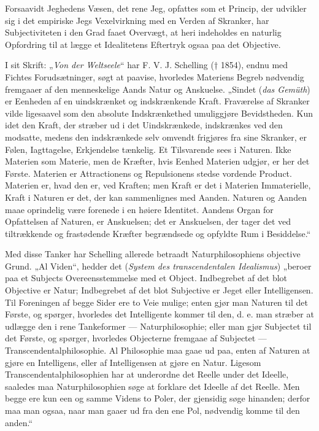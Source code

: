 \documentclass[12pt]{book}
\newcommand{\opage}[1]{\marginnote{\footnotesize\textit{[#1]}}}
\begin{document}
\opage{36} Forsaavidt Jeghedens Væsen, det rene Jeg, opfattes som et Princip, der udvikler sig
i det empiriske Jegs Vexelvirkning med en Verden af Skranker, har Subjectiviteten i
den Grad faaet Overvægt, at heri indeholdes en naturlig Opfordring til at lægge et
Idealitetens Eftertryk ogsaa paa det Objective.

I sit Skrift: „\textit{Von der Weltseele}“ har F. V. J. Schelling († 1854), endnu
med Fichtes Forudsætninger, søgt at paavise, hvorledes Materiens Begreb nødvendig
fremgaaer af den menneskelige Aands Natur og Anskuelse. „Sindet (\textit{das
Gemüth}) er Eenheden af en uindskrænket og indskrænkende Kraft. Fraværelse af
Skranker vilde ligesaavel som den absolute Indskrænkethed umuliggjøre Bevidstheden.
Kun idet den Kraft, der stræber ud i det Uindskrænkede, indskrænkes ved den
modsatte, medens den indskrænkede selv omvendt frigjøres fra sine Skranker, er
Følen, Iagttagelse, Erkjendelse tænkelig. Et Tilsvarende sees i Naturen. Ikke
Materien som Materie, men de Kræfter, hvis Eenhed Materien udgjør, er her det
Første. Materien er Attractionens og Repulsionens stedse vordende Product. Materien
er, hvad den er, ved Kraften; men Kraft er det i Materien Immaterielle, Kraft i
Naturen er det, der kan sammenlignes med Aanden. Naturen og Aanden maae oprindelig
være forenede i en høiere Identitet. Aandens Organ for Opfattelsen af Naturen, er
Anskuelsen; det er Anskuelsen, der tager det ved tiltrækkende og frastødende Kræfter
begrændsede og opfyldte Rum i Besiddelse.“

Med disse Tanker har Schelling allerede betraadt Naturphilosophiens objective Grund.
„Al Viden“, hedder det (\textit{System des transcendentalen Idealismus}) „beroer paa
et Subjects Overeensstemmelse med et Object. Indbegrebet af det blot Objective er
Natur; Indbegrebet af det blot Subjective er Jeget eller Intelligensen. Til
Foreningen af begge Sider ere to Veie mulige; enten gjør man Naturen til det Første,
og spørger, hvorledes det Intelligente kommer til den,
\opage{37} d. e. man stræber at udlægge den i rene Tankeformer --- Naturphilosophie; eller man
gjør Subjectet til det Første, og spørger, hvorledes Objecterne fremgaae af
Subjectet --- Transcendentalphilosophie. Al Philosophie maa gaae ud paa, enten af
Naturen at gjøre en Intelligens, eller af Intelligensen at gjøre en Natur. Ligesom
Transcendentalphilosophien har at underordne det Reelle under det Ideelle, saaledes
maa Naturphilosophien søge at forklare det Ideelle af det Reelle. Men begge ere kun
een og samme Videns to Poler, der gjensidig søge hinanden; derfor maa man ogsaa,
naar man gaaer ud fra den ene Pol, nødvendig komme til den anden.“
\end{document}
